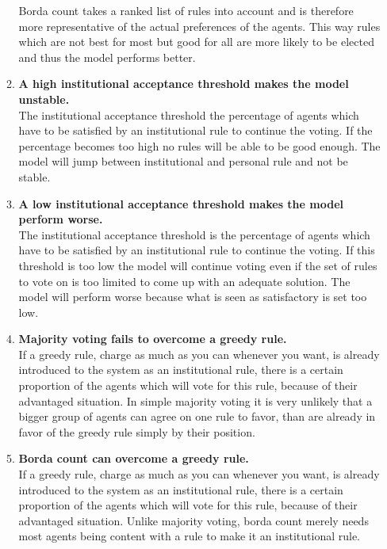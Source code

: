 \documentclass[a4paper]{article}
\begin{document}
\begin{enumerate}
\begin{enumerate}
					   Borda count takes a ranked list of rules into account and is therefore more 
					   representative of the actual preferences of the agents. This way rules which 
					   are not best for most but good for all are more likely to be elected and thus
					   the model performs better. 
					  \item \textbf{A high institutional acceptance threshold makes the model unstable.}\\
					  The institutional acceptance threshold the percentage of agents which have to be satisfied 
					  by an institutional rule to continue the voting. If the percentage becomes too high 
					  no rules will be able to be good enough. The model will jump between institutional 
					  and personal rule and not be stable.
					  \item \textbf{A low institutional acceptance threshold makes the model perform worse.}\\
					  The institutional acceptance threshold is the percentage of agents which have to be satisfied by 
					  an institutional rule to continue the voting.  If this threshold is too low the model will 
					  continue voting even if the set of rules to vote on is too limited to come
					  up with an adequate solution. The model will perform worse because what is 
					  seen as satisfactory is set too low. 
					  \item \textbf{Majority voting fails to overcome  a greedy rule.}\\
					  If a greedy rule, charge as much as you can whenever you want, is already 
					  introduced to the system as an institutional rule, there is a certain proportion
					  of the agents which will vote for this rule, because of their advantaged situation.
					  In simple majority voting it is very unlikely that a bigger group of agents
					  can agree on one rule to favor, than are already in favor of the greedy
					  rule simply by their position.
					  \item \textbf{Borda count can overcome a greedy rule.} \\
					  If a greedy rule, charge as much as you can whenever you want, is already 
					  introduced to the system as an institutional rule, there is a certain proportion
					  of the agents which will vote for this rule, because of their advantaged situation.
					  Unlike majority voting, borda count merely needs most agents being content with
					  a rule to make it an institutional rule.
					  \end{enumerate}

\end{enumerate}
\end{document}

